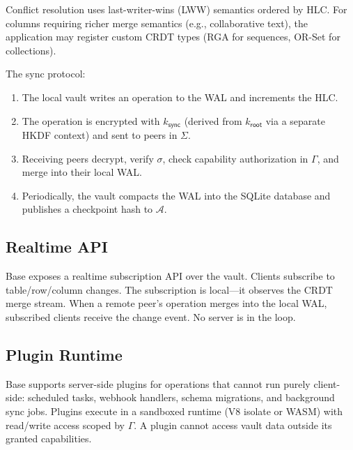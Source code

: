 Conflict resolution uses last-writer-wins (LWW) semantics ordered by HLC.
For columns requiring richer merge semantics (e.g., collaborative text), the
application may register custom CRDT types (RGA for sequences, OR-Set for
collections).

The sync protocol:

\begin{enumerate}[nosep]
  \item The local vault writes an operation to the WAL and increments the HLC.
  \item The operation is encrypted with $k_{\mathsf{sync}}$ (derived from
        $k_{\mathsf{root}}$ via a separate HKDF context) and sent to peers
        in $\Sigma$.
  \item Receiving peers decrypt, verify $\sigma$, check capability authorization
        in $\Gamma$, and merge into their local WAL.
  \item Periodically, the vault compacts the WAL into the SQLite database and
        publishes a checkpoint hash to $\mathcal{A}$.
\end{enumerate}

\subsection{Realtime API}

Base exposes a realtime subscription API over the vault. Clients subscribe to
table/row/column changes. The subscription is local---it observes the CRDT merge
stream. When a remote peer's operation merges into the local WAL, subscribed
clients receive the change event. No server is in the loop.

\subsection{Plugin Runtime}

Base supports server-side plugins for operations that cannot run purely
client-side: scheduled tasks, webhook handlers, schema migrations, and
background sync jobs. Plugins execute in a sandboxed runtime (V8 isolate or
WASM) with read/write access scoped by $\Gamma$. A plugin cannot access vault
data outside its granted capabilities.

